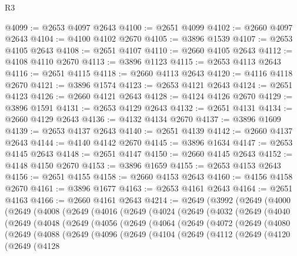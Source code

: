 \begin{lexlean}{R3}
\begin{coremodule}
@4099 := @2653 @4097 @2643
@4100 := @2651 @4099
@4102 := @2660 @4097 @2643
@4104 := @4100 @4102 @2670
@4105 := @3896 @1539
@4107 := @2653 @4105 @2643
@4108 := @2651 @4107
@4110 := @2660 @4105 @2643
@4112 := @4108 @4110 @2670
@4113 := @3896 @1123
@4115 := @2653 @4113 @2643
@4116 := @2651 @4115
@4118 := @2660 @4113 @2643
@4120 := @4116 @4118 @2670
@4121 := @3896 @1574
@4123 := @2653 @4121 @2643
@4124 := @2651 @4123
@4126 := @2660 @4121 @2643
@4128 := @4124 @4126 @2670
@4129 := @3896 @1591
@4131 := @2653 @4129 @2643
@4132 := @2651 @4131
@4134 := @2660 @4129 @2643
@4136 := @4132 @4134 @2670
@4137 := @3896 @1609
@4139 := @2653 @4137 @2643
@4140 := @2651 @4139
@4142 := @2660 @4137 @2643
@4144 := @4140 @4142 @2670
@4145 := @3896 @1634
@4147 := @2653 @4145 @2643
@4148 := @2651 @4147
@4150 := @2660 @4145 @2643
@4152 := @4148 @4150 @2670
@4153 := @3896 @1659
@4155 := @2653 @4153 @2643
@4156 := @2651 @4155
@4158 := @2660 @4153 @2643
@4160 := @4156 @4158 @2670
@4161 := @3896 @1677
@4163 := @2653 @4161 @2643
@4164 := @2651 @4163
@4166 := @2660 @4161 @2643
@4214 := @2649
    (@3992
      (@2649
        (@4000
          (@2649
            (@4008
              (@2649
                (@4016
                  (@2649
                    (@4024
                      (@2649
                        (@4032
                          (@2649
                            (@4040
                              (@2649
                                (@4048
                                  (@2649
                                    (@4056
                                      (@2649
                                        (@4064
                                          (@2649
                                            (@4072
                                              (@2649
                                                (@4080
                                                  (@2649
                                                    (@4088
                                                      (@2649
                                                        (@4096
                                                          (@2649
                                                            (@4104
                                                              (@2649
                                                                (@4112
                                                                  (@2649
                                                                    (@4120
                                                                      (@2649
                                                                        (@4128

\end{coremodule}
\end{lexlean}
